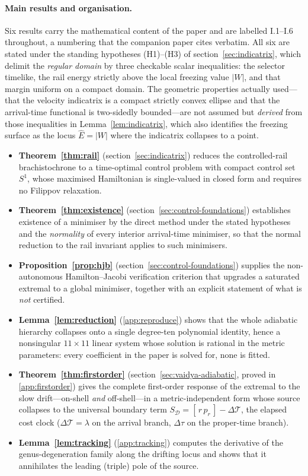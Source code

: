 \documentclass[12pt]{iopart}
\newcommand{\Ehat}{\hat E}
\theoremstyle{plain}
\theoremstyle{definition}
\theoremstyle{plain}
\theoremstyle{remark}
\begin{document}
\paragraph{Main results and organisation.} Six results carry the mathematical content of
the paper and are labelled I.1--I.6 throughout, a numbering that the companion paper cites
verbatim. All six are stated under the standing hypotheses (H1)--(H3) of
section~\ref{sec:indicatrix}, which delimit the \emph{regular domain} by three checkable
scalar inequalities: the selector timelike, the rail energy strictly above the local
freezing value $|W|$, and that margin uniform on a compact domain. The geometric
properties actually used---that the velocity indicatrix is a compact strictly convex
ellipse and that the arrival-time functional is two-sidedly bounded---are not assumed but
\emph{derived} from those inequalities in Lemma~\ref{lem:indicatrix}, which also identifies
the freezing surface as the locus $\Ehat=|W|$ where the indicatrix collapses to a point.
\begin{itemize}\itemsep2pt
\item \textbf{Theorem~\ref{thm:rail}} (section~\ref{sec:indicatrix}) reduces the
controlled-rail brachistochrone to a time-optimal control problem with compact control set
$S^1$, whose maximised Hamiltonian is single-valued in closed form and requires no
Filippov relaxation.
\item \textbf{Theorem~\ref{thm:existence}} (section~\ref{sec:control-foundations})
establishes existence of a minimiser by the direct method under the stated hypotheses and
the \emph{normality} of every interior arrival-time minimiser, so that the normal reduction
to the rail invariant applies to such minimisers.
\item \textbf{Proposition~\ref{prop:hjb}} (section~\ref{sec:control-foundations}) supplies
the non-autonomous Hamilton--Jacobi verification criterion that upgrades a saturated
extremal to a global minimiser, together with an explicit statement of what is
\emph{not} certified.
\item \textbf{Lemma~\ref{lem:reduction}} (\ref{app:reproduce}) shows that the whole
adiabatic hierarchy collapses onto a single degree-ten polynomial identity, hence a
nonsingular $11\times11$ linear system whose solution is rational in the metric
parameters: every coefficient in the paper is solved for, none is fitted.
\item \textbf{Theorem~\ref{thm:firstorder}} (section~\ref{sec:vaidya-adiabatic}, proved in
\ref{app:firstorder}) gives the complete first-order response of the extremal to the slow
drift---on-shell \emph{and} off-shell---in a metric-independent form whose source collapses
to the universal boundary term $S_{\mathcal D}=[\,r\,p_r\,]-\Delta\mathcal T$, the elapsed
cost clock ($\Delta\mathcal T=\lambda$ on the arrival branch, $\Delta\tau$ on the proper-time
branch).
\item \textbf{Lemma~\ref{lem:tracking}} (\ref{app:tracking}) computes the derivative of the
genus-degeneration family along the drifting locus and shows that it annihilates the
leading (triple) pole of the source.
\end{itemize}
\end{document}
